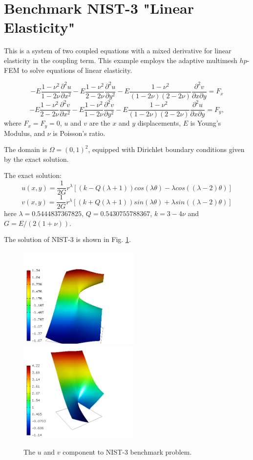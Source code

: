 \section{Benchmark NIST-3 "Linear Elasticity"}
\label{sec:bench-3}

This is a system of two coupled equations with a mixed
derivative for linear elasticity in the coupling term.
This example employs the adaptive multimesh $hp$-FEM 
to solve equations of linear elasticity.

\begin{equation} \label{crack-u}
-E \frac{1-\nu^2}{1-2\nu} \frac{\partial^{2} u}{\partial x^{2}} - E\frac{1-\nu^2}{2-2 \nu} \frac{\partial^{2} u}{\partial y^{2}}
-E \frac{1-\nu^2}{(1-2\nu)(2-2\nu)} \frac{\partial^{2} v}{\partial x \partial y} = F_{x}
\end{equation}
\begin{equation} \label{crack-v}
-E \frac{1-\nu^2}{2-2\nu} \frac{\partial^{2} v}{\partial x^{2}} - E\frac{1-\nu^2}{1-2\nu} \frac{\partial^{2} v}{\partial y^{2}}
-E \frac{1-\nu^2}{(1-2\nu)(2-2\nu)} \frac{\partial^{2} u}{\partial x \partial y} = F_{y},
\end{equation}
where $F_{x} = F_{y} = 0$, $u$ and $v$ are the
$x$ and $y$ displacements, $E$ is Young's Modulus,
and $\nu$ is Poisson's ratio.

The domain is $\Omega = (0, 1)^2$, equipped with Dirichlet
boundary conditions given by the exact solution.

The exact solution:
\begin{equation}\label{exact-nist-3-u-1}
u(x, y) = \frac{1}{2G} r^{\lambda}[(k - Q(\lambda + 1))cos(\lambda \theta) - \lambda cos((\lambda - 2) \theta)]
\end{equation}
\begin{equation}\label{exact-nist-3-v-1}
v(x, y) = \frac{1}{2G} r^{\lambda}[(k + Q(\lambda + 1))sin(\lambda \theta) + \lambda sin((\lambda - 2) \theta)]
\end{equation}
here $\lambda = 0.5444837367825$, $Q = 0.5430755788367$,
$k = 3 - 4 \nu$ and $G = E / (2(1 + \nu))$.

The solution of NIST-3 is shown in Fig. \ref{fig:sln-nist03}.

\begin{figure}[!ht]
\centering
\includegraphics[height=50mm]{nist/nist-3/solution-u.png}\ \
\includegraphics[height=50mm]{nist/nist-3/solution-v.png}
\vspace{-2mm}
\caption{The $u$ and $v$ component to NIST-3 benchmark problem.}
\label{fig:sln-nist03}
\end{figure}
